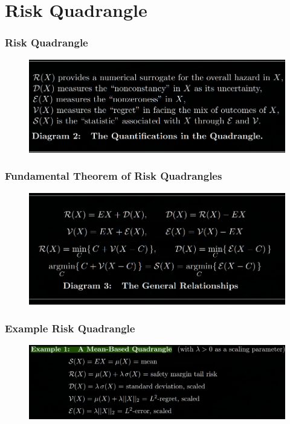 \documentclass{beamer}
\begin{document}
\section*{Risk Quadrangle}
\begin{frame}
	\frametitle{Risk Quadrangle}
  \vfill
  \begin{figure}[ht]
    \centering
    \includegraphics[width=\textwidth]{./imgs/riskquaddesc.png}
  \end{figure}
  \vfill
\end{frame}
\begin{frame}
	\frametitle{Fundamental Theorem of Risk Quadrangles}
  \vfill
  \begin{figure}[ht]
    \centering
    \includegraphics[width=\textwidth]{./imgs/alleged_connections.png}
  \end{figure}
  \vfill
\end{frame}
\begin{frame}
	\frametitle{Example Risk Quadrangle}
  \vfill
  \begin{figure}[ht]
    \centering
    \includegraphics[width=\textwidth]{./imgs/expectation_example.png}
  \end{figure}
  \vfill
\end{frame}
\end{document}
